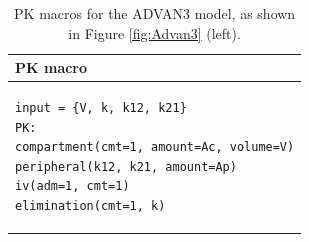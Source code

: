\begin{table}[h!]
\setlength{\tabcolsep}{15pt}
\begin{center}
\begin{tabular}{l}
  \hline \hline
PK macro \\[-.25ex]
  \hline
\lstset{language=NONMEMdataSet}
\begin{lstlisting}
input = {V, k, k12, k21}
PK:
compartment(cmt=1, amount=Ac, volume=V)
peripheral(k12, k21, amount=Ap)
iv(adm=1, cmt=1)
elimination(cmt=1, k)
\end{lstlisting}
\\
  \hline
\end{tabular}
\caption{PK macros  for the ADVAN3 model, as shown in Figure \ref{fig:Advan3} (left).}
\label{tab:advan3Table}
\end{center}
\end{table}


